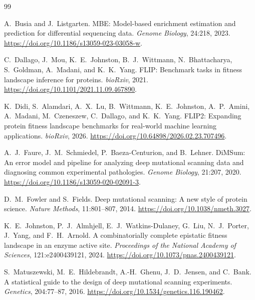 \begin{thebibliography}{99}

A.~Busia and J.~Listgarten.
\newblock MBE: Model-based enrichment estimation and prediction for differential
sequencing data.
\newblock \emph{Genome Biology}, 24:218, 2023.
\newblock \url{https://doi.org/10.1186/s13059-023-03058-w}.

C.~Dallago, J.~Mou, K.~E.~Johnston, B.~J.~Wittmann, N.~Bhattacharya,
S.~Goldman, A.~Madani, and K.~K.~Yang.
\newblock FLIP: Benchmark tasks in fitness landscape inference for proteins.
\newblock \emph{bioRxiv}, 2021.
\newblock \url{https://doi.org/10.1101/2021.11.09.467890}.

K.~Didi, S.~Alamdari, A.~X.~Lu, B.~Wittmann, K.~E.~Johnston,
A.~P.~Amini, A.~Madani, M.~Czeneszew, C.~Dallago, and K.~K.~Yang.
\newblock FLIP2: Expanding protein fitness landscape benchmarks for real-world
machine learning applications.
\newblock \emph{bioRxiv}, 2026.
\newblock \url{https://doi.org/10.64898/2026.02.23.707496}.

A.~J.~Faure, J.~M.~Schmiedel, P.~Baeza-Centurion, and B.~Lehner.
\newblock DiMSum: An error model and pipeline for analyzing deep mutational
scanning data and diagnosing common experimental pathologies.
\newblock \emph{Genome Biology}, 21:207, 2020.
\newblock \url{https://doi.org/10.1186/s13059-020-02091-3}.

D.~M.~Fowler and S.~Fields.
\newblock Deep mutational scanning: A new style of protein science.
\newblock \emph{Nature Methods}, 11:801--807, 2014.
\newblock \url{https://doi.org/10.1038/nmeth.3027}.

K.~E.~Johnston, P.~J.~Almhjell, E.~J.~Watkins-Dulaney, G.~Liu,
N.~J.~Porter, J.~Yang, and F.~H.~Arnold.
\newblock A combinatorially complete epistatic fitness landscape in an enzyme
active site.
\newblock \emph{Proceedings of the National Academy of Sciences},
121:e2400439121, 2024.
\newblock \url{https://doi.org/10.1073/pnas.2400439121}.

S.~Matuszewski, M.~E.~Hildebrandt, A.-H.~Ghenu, J.~D.~Jensen, and C.~Bank.
\newblock A statistical guide to the design of deep mutational scanning experiments.
\newblock \emph{Genetics}, 204:77--87, 2016.
\newblock \url{https://doi.org/10.1534/genetics.116.190462}.


\end{thebibliography}
